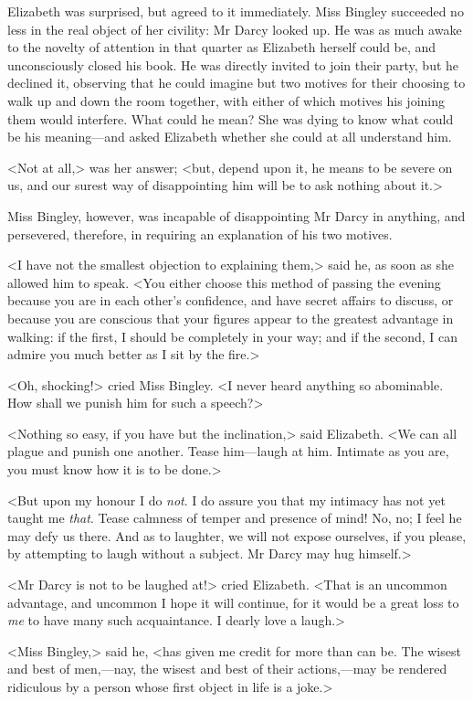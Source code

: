 Elizabeth was surprised, but agreed to it immediately. Miss Bingley succeeded no less in the real object of her civility: Mr Darcy looked up. He was as much awake to the novelty of attention in that quarter as Elizabeth herself could be, and unconsciously closed his book. He was directly invited to join their party, but he declined it, observing that he could imagine but two motives for their choosing to walk up and down the room together, with either of which motives his joining them would interfere. What could he mean? She was dying to know what could be his meaning—and asked Elizabeth whether she could at all understand him.

<Not at all,> was her answer; <but, depend upon it, he means to be severe on us, and our surest way of disappointing him will be to ask nothing about it.>

Miss Bingley, however, was incapable of disappointing Mr Darcy in anything, and persevered, therefore, in requiring an explanation of his two motives.

<I have not the smallest objection to explaining them,> said he, as soon as she allowed him to speak. <You either choose this method of passing the evening because you are in each other's confidence, and have secret affairs to discuss, or because you are conscious that your figures appear to the greatest advantage in walking: if the first, I should be completely in your way; and if the second, I can admire you much better as I sit by the fire.>

<Oh, shocking!> cried Miss Bingley. <I never heard anything so abominable. How shall we punish him for such a speech?>

<Nothing so easy, if you have but the inclination,> said Elizabeth. <We can all plague and punish one another. Tease him—laugh at him. Intimate as you are, you must know how it is to be done.>

<But upon my honour I do \textit{not}. I do assure you that my intimacy has not yet taught me \textit{that}. Tease calmness of temper and presence of mind! No, no; I feel he may defy us there. And as to laughter, we will not expose ourselves, if you please, by attempting to laugh without a subject. Mr Darcy may hug himself.>

<Mr Darcy is not to be laughed at!> cried Elizabeth. <That is an uncommon advantage, and uncommon I hope it will continue, for it would be a great loss to \textit{me} to have many such acquaintance. I dearly love a laugh.>

<Miss Bingley,> said he, <has given me credit for more than can be. The wisest and best of men,—nay, the wisest and best of their actions,—may be rendered ridiculous by a person whose first object in life is a joke.>

